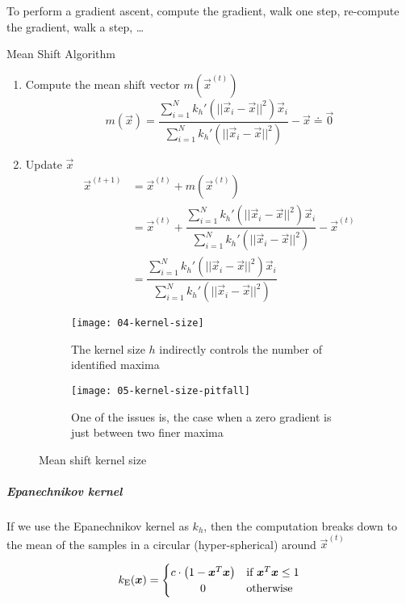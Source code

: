 To perform a gradient ascent, compute the gradient, walk one step, re-compute the gradient, walk a step, \ldots

\begin{algorithm}[H]
\caption{Mean Shift Algorithm}
\begin{enumerate}
  \item Compute the mean shift vector $m\left(\vec{x}^{(t)}\right)$
  \begin{equation*}
    m(\vec{x}) = \dfrac{\sum_{i=1}^N k_h'\left(||\vec{x}_i - \vec{x}||^2\right) \vec{x}_i}{\sum_{i=1}^N k_h'\left(||\vec{x}_i - \vec{x}||^2\right)} - \vec{x} \doteq \vec{0}
  \end{equation*}
  \item Update $\vec{x}$
  \begin{align*}
    \vec{x}^{(t+1)}&=\vec{x}^{(t)} + m\left(\vec{x}^{(t)}\right) \\
    &=\vec{x}^{(t)} + \dfrac{\sum_{i=1}^N k_h'\left(||\vec{x}_i - \vec{x}||^2\right) \vec{x}_i}{\sum_{i=1}^N k_h'\left(||\vec{x}_i - \vec{x}||^2\right)} - \vec{x}^{(t)} \\
    &= \dfrac{\sum_{i=1}^N k_h'\left(||\vec{x}_i - \vec{x}||^2\right) \vec{x}_i}{\sum_{i=1}^N k_h'\left(||\vec{x}_i - \vec{x}||^2\right)}
  \end{align*}
\end{enumerate}
\end{algorithm}

\begin{figure}[H] 
	\centering
	\begin{subfigure}[b]{0.4\textwidth}
		\texttt{[image: 04-kernel-size]}
		\caption{The kernel size $h$ indirectly controls the number of identified maxima}
	\end{subfigure}
	\hspace{1cm}
	\begin{subfigure}[b]{0.4\textwidth}
		\texttt{[image: 05-kernel-size-pitfall]}
		\caption{One of the issues is, the case when a zero gradient is just between two finer maxima}	
		\label{mean-shift-issue}	
	\end{subfigure}
	\caption{Mean shift kernel size}
\end{figure}

\subparagraph{Epanechnikov kernel}
If we use the Epanechnikov kernel as $k_h$, then the computation breaks down to the mean of the samples in a circular (hyper-spherical) around $\vec{x}^{(t)}$

\begin{equation*}
  \idx{k}{E}(\vec{x}) = \begin{cases}
    c \cdot \left(1 - \vec{x}^T \vec{x}\right)&\text{if } \vec{x}^T \vec{x} \le 1\\
    \hfil 0 &\text{otherwise}
  \end{cases}
\end{equation*}

